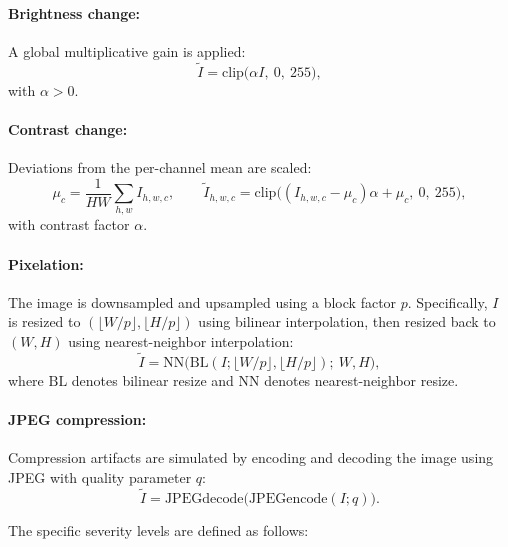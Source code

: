 \documentclass[final,twoside]{vutinfth}
\begin{document}
\paragraph{Brightness change:}
A global multiplicative gain is applied:
\begin{equation}
\tilde{I} = \mathrm{clip}\big(\alpha I,\ 0,\ 255\big),
\end{equation}
with $\alpha>0$.

\paragraph{Contrast change:}
Deviations from the per-channel mean are scaled:
\begin{equation}
\mu_c = \frac{1}{HW}\sum_{h,w} I_{h,w,c}, \qquad
\tilde{I}_{h,w,c} = \mathrm{clip}\big((I_{h,w,c}-\mu_c)\alpha + \mu_c,\ 0,\ 255\big),
\end{equation}
with contrast factor $\alpha$.

\paragraph{Pixelation:}
The image is downsampled and upsampled using a block factor $p$. Specifically, $I$ is resized to $(\lfloor W/p\rfloor, \lfloor H/p\rfloor)$ using bilinear interpolation, then resized back to $(W,H)$ using nearest-neighbor interpolation:
\begin{equation}
\tilde{I} = \mathrm{NN}\big(\mathrm{BL}(I; \lfloor W/p\rfloor,\lfloor H/p\rfloor);\ W,H\big),
\end{equation}
where $\mathrm{BL}$ denotes bilinear resize and $\mathrm{NN}$ denotes nearest-neighbor resize.

\paragraph{JPEG compression:}
Compression artifacts are simulated by encoding and decoding the image using JPEG with quality parameter $q$:
\begin{equation}
\tilde{I} = \mathrm{JPEGdecode}\big(\mathrm{JPEGencode}(I; q)\big).
\end{equation}

The specific severity levels are defined as follows:
\end{document}

